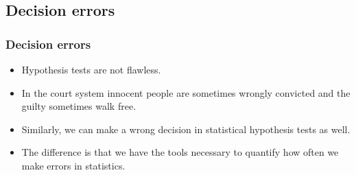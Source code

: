 \documentclass[t,compress,mathserif]{beamer}
\begin{document}

\subsection{Decision errors}


\begin{frame}
\frametitle{Decision errors}

\begin{itemize}

\item Hypothesis tests are not flawless.

\item In the court system innocent people are sometimes wrongly convicted and the guilty sometimes walk free.

\item Similarly, we can make a wrong decision in statistical hypothesis tests as well. 

\item The difference is that we have the tools necessary to quantify how often we make errors in statistics.

\end{itemize}

\end{frame}

\end{document}
